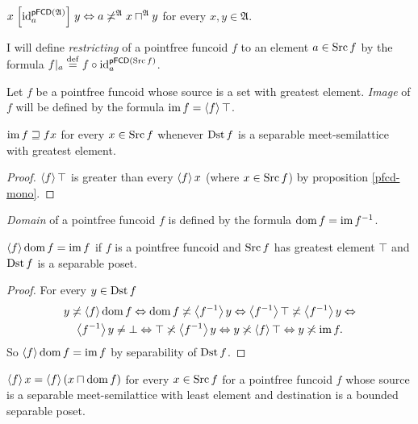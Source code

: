 \begin{obvious}
$x\mathrel{\left[\operatorname{id}_{a}^{\mathsf{pFCD}(\mathfrak{A})}\right]}y\Leftrightarrow a\not\asymp^{\mathfrak{A}}x\sqcap^{\mathfrak{A}}y$
for every $x,y\in\mathfrak{A}$.\end{obvious}
\begin{defn}
I will define \emph{restricting}
of a pointfree funcoid $f$ to an element $a\in\operatorname{Src} f$ by the formula
$f|_{a}\overset{\mathrm{def}}{=} f\circ\operatorname{id}_{a}^{\mathsf{pFCD}(\operatorname{Src} f)}$.
\end{defn}

\begin{defn}
Let $f$ be a pointfree funcoid whose
source is a set with greatest element. \emph{Image} of $f$ will be
defined by the formula $\operatorname{im} f=\left\langle f\right\rangle\top$.\end{defn}
\begin{obvious}
$\operatorname{im} f\sqsupseteq fx$ for every $x\in\operatorname{Src} f$ whenever $\operatorname{Dst} f$
is a separable meet-semilattice with greatest element.\end{obvious}
\begin{proof}
$\left\langle f\right\rangle\top$ is greater than every $\left\langle f\right\rangle x$ (where $x\in\operatorname{Src} f$)
by proposition \ref{pfcd-mono}.\end{proof}
\begin{defn}
\emph{Domain} of a pointfree funcoid
$f$ is defined by the formula $\operatorname{dom} f=\operatorname{im} f^{-1}$.\end{defn}
\begin{prop}
$\left\langle f\right\rangle\operatorname{dom} f=\operatorname{im} f$ if $f$ is a pointfree funcoid and $\operatorname{Src} f$
has greatest element $\top$ and $\operatorname{Dst} f$ is a separable poset.\end{prop}
\begin{proof}
For every $y\in\operatorname{Dst} f$
\begin{multline*}
y\not\asymp\left\langle f\right\rangle\operatorname{dom} f\Leftrightarrow\operatorname{dom} f\not\asymp\left\langle f^{-1}\right\rangle y\Leftrightarrow\left\langle f^{-1}\right\rangle\top\not\asymp\left\langle f^{-1}\right\rangle y\Leftrightarrow\\
\left\langle f^{-1}\right\rangle y\ne\bot\Leftrightarrow\top\not\asymp\left\langle f^{-1}\right\rangle y\Leftrightarrow y\not\asymp\left\langle f\right\rangle\top\Leftrightarrow y\not\asymp\operatorname{im} f.
\end{multline*}
So $\left\langle f\right\rangle\operatorname{dom} f=\operatorname{im} f$ by separability of $\operatorname{Dst} f$.\end{proof}
\begin{prop}
$\left\langle f\right\rangle x=\left\langle f\right\rangle(x\sqcap\operatorname{dom} f)$
for every $x\in\operatorname{Src} f$ for a pointfree funcoid $f$ whose source
is a separable meet-semilattice with least element and destination is a bounded separable poset.\end{prop}
